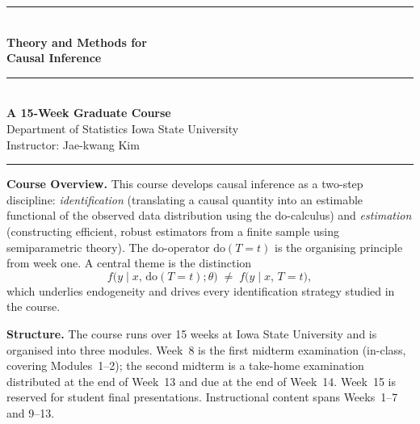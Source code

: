 \documentclass[12pt]{article}
\begin{document}

\thispagestyle{empty}
\begin{center}
  \vspace*{1.2cm}
  {\color{darkblue}\rule{\linewidth}{2pt}}\\[12pt]
  {\Huge\bfseries\color{darkblue}
 Theory and Methods for\\[6pt] Causal Inference}\\[12pt]
  {\color{midblue}\rule{\linewidth}{1pt}}\\[16pt]
  {\LARGE\bfseries\color{midblue} A 15-Week Graduate Course}\\[20pt]
  {\large Department of Statistics \quad\textbullet\quad Iowa State University}\\[8pt]
  {\large Instructor: Jae-kwang Kim}\\[8pt]
  {\color{darkblue}\rule{\linewidth}{2pt}}
\end{center}

\vspace{0.8cm}

\begin{mdframed}[
  backgroundcolor=lightblue, linecolor=midblue, linewidth=1.5pt,
  innerleftmargin=14pt, innerrightmargin=14pt,
  innertopmargin=10pt, innerbottommargin=10pt]
\noindent\textbf{\color{darkblue}Course Overview.}
This course develops causal inference as a two-step discipline:
\emph{identification} (translating a causal quantity into an estimable
functional of the observed data distribution using the do-calculus) and
\emph{estimation} (constructing efficient, robust estimators from a finite
sample using semiparametric theory). The do-operator $\mathrm{do}(T{=}t)$
is the organising principle from week one. A central theme is the distinction
\[
  f\!\bigl(y \mid x,\,\mathrm{do}(T{=}t);\theta\bigr)
  \;\neq\;
  f\!\bigl(y \mid x,\, T{=}t\bigr),
\]
which underlies endogeneity and drives every identification strategy studied
in the course.

\medskip
\noindent\textbf{Structure.} The course runs over 15 weeks at Iowa State
University and is organised into three modules. Week~8 is the first midterm
examination (in-class, covering Modules~1--2); the second midterm is a
take-home examination distributed at the end of Week~13 and due at the end
of Week~14. Week~15 is reserved for student final presentations.
Instructional content spans Weeks~1--7 and 9--13.
\end{mdframed}
\end{document}
